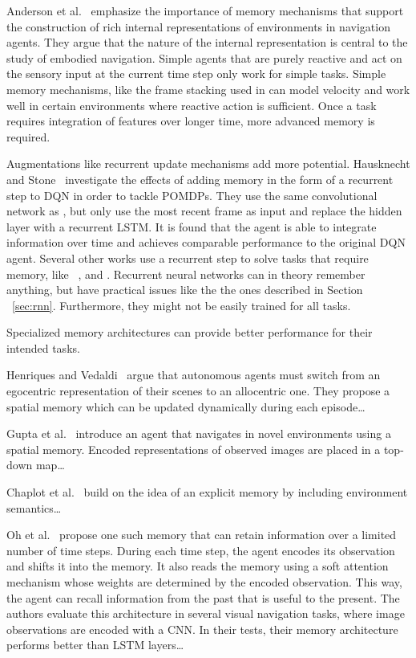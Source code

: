 Anderson et al.~\cite{anderson_evaluation_2018} emphasize the importance of memory mechanisms that support the construction of rich internal representations of environments in navigation agents.
They argue that the nature of the internal representation is central to the study of embodied navigation.
Simple agents that are purely reactive and act on the sensory input at the current time step only work for simple tasks.
Simple memory mechanisms, like the frame stacking used in \cite{mnih_human_2015} can model velocity and work well in certain environments where reactive action is sufficient.
Once a task requires integration of features over longer time, more advanced memory is required.

Augmentations like recurrent update mechanisms add more potential.
Hausknecht and Stone~\cite{hausknecht_stone_2017} investigate the effects of adding memory in the form of a recurrent step to DQN in order to tackle POMDPs.
They use the same convolutional network as \cite{mnih_human_2015}, but only use the most recent frame as input and replace the hidden layer with a recurrent LSTM.
It is found that the agent is able to integrate information over time and achieves comparable performance to the original DQN agent.
Several other works use a recurrent step to solve tasks that require memory, like ~\cite{mnih_attention_2014}, and \cite{mnih_asynchronous_2016}.
Recurrent neural networks can in theory remember anything, but have practical issues like the the ones described in Section ~\ref{sec:rnn}.
Furthermore, they might not be easily trained for all tasks.


Specialized memory architectures can provide better performance for their intended tasks.

Henriques and Vedaldi~\cite{henriques_vedaldi_2018} argue that autonomous agents must switch from an egocentric representation of their scenes to an allocentric one.
They propose a spatial memory which can be updated dynamically during each episode\dots

Gupta et al.~\cite{gupta_cognitive_2019} introduce an agent that navigates in novel environments using a spatial memory.
Encoded representations of observed images are placed in a top-down map\dots

Chaplot et al.~\cite{chaplot_semantic_2020} build on the idea of an explicit memory by including environment semantics\dots

Oh et al.~\cite{oh_minecraft_2016} propose one such memory that can retain information over a limited number of time steps.
During each time step, the agent encodes its observation and shifts it into the memory.
It also reads the memory using a soft attention~\cite{bahdanau_attention_2016} mechanism whose weights are determined by the encoded observation.
This way, the agent can recall information from the past that is useful to the present.
The authors evaluate this architecture in several visual navigation tasks, where image observations are encoded with a CNN.
In their tests, their memory architecture performs better than LSTM layers\dots


